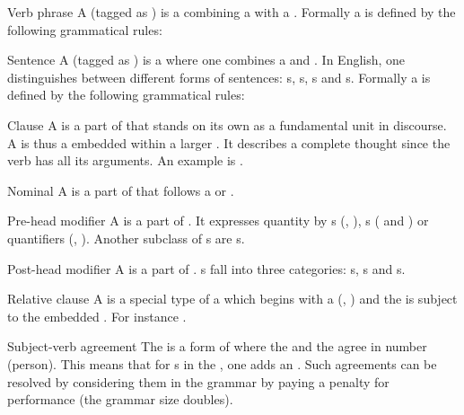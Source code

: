 \begin{df}[VP]{Verb phrase}
A \sb{} (tagged as ) is a  combining a  with a . Formally a \sb{} is defined by the following grammatical rules: 
\end{df}
\begin{df}[S]{Sentence}
A \sb{} (tagged as ) is a  where one combines a  and . In English, one distinguishes between different forms of sentences: s, s, s and s. Formally a \sb{} is defined by the following grammatical rules: 
\end{df}
\begin{df}{Clause}
A \sb{} is a part of  that stands on its own as a fundamental unit in discourse. A \sb{} is thus a  embedded within a larger . It describes a complete thought since the verb has all its arguments. An example is .
\end{df}
\begin{df}[Nom]{Nominal}
A \sb{} is a part of  that follows a  or .
\end{df}
\begin{df}{Pre-head modifier}
A \sb{} is a part of . It expresses quantity by s (, ), s ( and ) or quantifiers (, ). Another subclass of \sb{}s are s.
\end{df}
\begin{df}{Post-head modifier}
A \sb{} is a part of . \sb{}s fall into three categories: s, s and s.
\end{df}
\begin{df}{Relative clause}
A \sb{} is a special type of a  which begins with a  (, ) and the  is subject to the embedded . For instance .
\end{df}
\begin{df}{Subject-verb agreement}
The \sb{} is a form of  where the  and the  agree in number (person). This means that for s in the , one adds an . Such agreements can be resolved by considering them in the grammar by paying a penalty for performance (the grammar size doubles).
\end{df}
